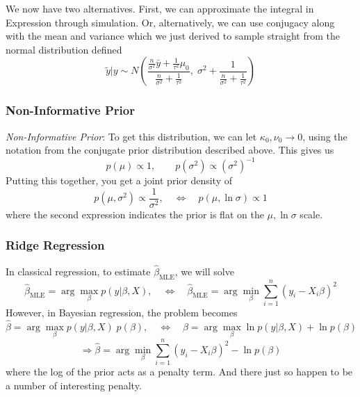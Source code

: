 \documentclass[12pt]{article}
\theoremstyle{plain}
\theoremstyle{definition}
\theoremstyle{remark}
\begin{document}
We now have two alternatives. First, we can approximate the integral
in Expression through simulation. Or, alternatively, we
can use conjugacy along with the mean and variance which we just derived
to sample straight from the normal distribution defined
\[ \tilde{y} | y\sim N\left(\frac{\frac{n}{\sigma^2} \bar{y}
      + \frac{1}{\tau^2} \mu_0}{\frac{n}{\sigma^2} + \frac{1}{\tau^2}},
       \; \sigma^2 + \frac{1}{\frac{n}{\sigma^2} +
      \frac{1}{\tau^2}}\right) \]


\subsubsection{Non-Informative Prior}

{\sl Non-Informative Prior}: To get this distribution, we can let
$\kappa_0, \nu_0\rightarrow 0$, using the notation from the conjugate
prior distribution described above. This gives us
   \[ p(\mu) \propto 1, \qquad p(\sigma^2) \propto (\sigma^2)^{-1} \]
Putting this together, you get a joint prior density of
   \[ p(\mu, \sigma^2) \propto \frac{1}{\sigma^2}, \quad\Leftrightarrow
      \quad p(\mu, \ln \sigma) \propto 1 \]
where the second expression indicates the prior is flat on the
$\mu, \ln \sigma$ scale.


\newpage
\subsubsection{Ridge Regression}

In classical regression, to estimate $\hat{\beta}_{\text{MLE}}$,
we will solve
\[ \hat{\beta}_{\text{MLE}} = \arg \max_{\beta} p(y | \beta, X),
   \quad \Leftrightarrow \quad \hat{\beta}_{\text{MLE}} =
   \arg \min_{\beta} \sum^n_{i=1} (y_i - X_i \beta)^2
   \]
However, in Bayesian regression, the problem becomes
\[ \hat{\beta}= \arg \max_{\beta} p(y | \beta, X)\;p(\beta),
   \quad \Leftrightarrow \quad \hat{\beta} =
   \arg \max_{\beta} \ln p(y | \beta, X) + \ln p(\beta)
   \]
\[ \Rightarrow \hat{\beta} = \arg \min_\beta \sum^n_{i=1}
   (y_i - X_i \beta)^2 - \ln p(\beta) \]
where the log of the prior acts as a penalty term. And there just so happen to be a number of interesting penalty.
\end{document}

